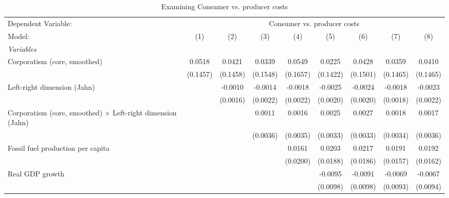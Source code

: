
\begin{table}[htbp]
   \caption{Examining Consumer vs. producer costs}
   \centering
   \begin{tabular}{lcccccccc}
      \tabularnewline \midrule \midrule
      Dependent Variable: & \multicolumn{8}{c}{Consumer vs. producer costs}\\
      Model:                                                             & (1)      & (2)      & (3)      & (4)      & (5)      & (6)      & (7)      & (8)\\  
      \midrule
      \emph{Variables}\\
      Corporatism (core, smoothed)                                       & 0.0518   & 0.0421   & 0.0339   & 0.0549   & 0.0225   & 0.0428   & 0.0359   & 0.0410\\   
                                                                         & (0.1457) & (0.1458) & (0.1548) & (0.1657) & (0.1422) & (0.1501) & (0.1465) & (0.1465)\\   
      Left-right dimension (Jahn)                                        &          & -0.0010  & -0.0014  & -0.0018  & -0.0025  & -0.0024  & -0.0018  & -0.0023\\   
                                                                         &          & (0.0016) & (0.0022) & (0.0022) & (0.0020) & (0.0020) & (0.0018) & (0.0022)\\   
      Corporatism (core, smoothed) $\times$ Left-right dimension (Jahn)  &          &          & 0.0011   & 0.0016   & 0.0025   & 0.0027   & 0.0018   & 0.0017\\   
                                                                         &          &          & (0.0036) & (0.0035) & (0.0033) & (0.0033) & (0.0034) & (0.0036)\\   
      Fossil fuel production per capita                                  &          &          &          & 0.0161   & 0.0203   & 0.0217   & 0.0191   & 0.0192\\   
                                                                         &          &          &          & (0.0200) & (0.0188) & (0.0186) & (0.0157) & (0.0162)\\   
      Real GDP growth                                                    &          &          &          &          & -0.0095  & -0.0091  & -0.0069  & -0.0067\\   
                                                                         &          &          &          &          & (0.0098) & (0.0098) & (0.0093) & (0.0094)\\   

\end{tabular}
\end{table}
